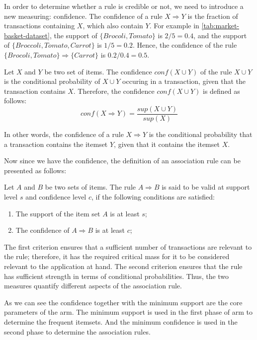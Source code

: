 In order to determine whether a rule is credible or not, we need to introduce a new measuring: confidence.
The confidence of a rule $X \Rightarrow Y$ is the fraction of transactions containing $X$, which also contain $Y$.
For example in \autoref{tab:market-basket-dataset}, the support of $\{Brocoli, Tomato\}$ is $2/5=0.4$, and the support of $\{Broccoli, Tomato, Carrot\}$ is $1/5=0.2$.
Hence, the confidence of the rule $\{Brocoli, Tomato\} \Rightarrow \{Carrot\}$ is $0.2 / 0.4 = 0.5$.
\begin{definition}
    Let $X$ and $Y$ be two set of items.
    The confidence $conf(X \cup Y)$ of the rule $X \cup Y$ is the conditional probability of $X \cup Y$ occuring in a transaction, given that the transaction contains $X$.
    Therefore, the confidence $conf(X \cup Y)$ is defined as follows:
    \begin{equation}
        conf(X \Rightarrow Y) = \frac{sup(X \cup Y)}{sup(X)}
    \end{equation}
\end{definition}
In other words, the confidence of a rule $X \Rightarrow Y$ is the conditional probability that a transaction contains the itemset $Y$, given that it contains the itemset $X$.

Now since we have the confidence, the definition of an association rule can be presented as follows:
\begin{definition}
    Let $A$ and $B$ be two sets of items.
    The rule $A \Rightarrow B$ is said to be valid at support level $s$ and confidence level $c$, if the following conditions are satisfied:
    \begin{enumerate}
        \item The support of the item set $A$ is at least $s$;
        \item The confidence of $A \Rightarrow B$ is at least $c$;
    \end{enumerate}
    The first criterion ensures that a sufficient number of transactions are relevant to the rule; therefore, it has the required critical mass for it to be considered relevant to the application at hand.
    The second criterion ensures that the rule has sufficient strength in terms of conditional probabilities.
    Thus, the two measures quantify different aspects of the association rule.
\end{definition}
As we can see the confidence together with the minimum support are the core parameters of the \acl{arm}.
The minimum support is used in the first phase of \acl{arm} to determine the frequent itemsets.
And the minimum confidence is used in the second phase to determine the association rules.

